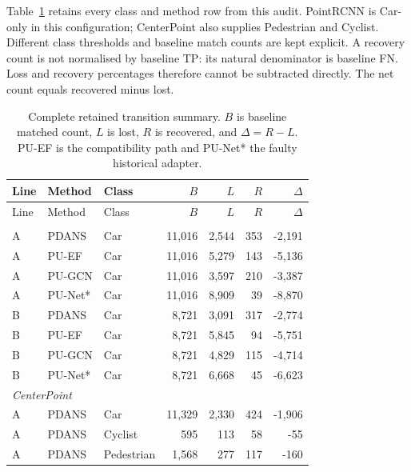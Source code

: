 
Table~\ref{tab:k-transition-all} retains every class and method row
from this audit. PointRCNN is Car-only in this configuration; CenterPoint
also supplies Pedestrian and Cyclist. Different class thresholds and
baseline match counts are kept explicit. A recovery count is not
normalised by baseline TP: its natural denominator is baseline FN.
Loss and recovery percentages therefore cannot be subtracted directly.
The net count equals recovered minus lost.

\begin{longtable}{lllrrrr}
\caption{Complete retained transition summary. $B$ is baseline matched
count, $L$ is lost, $R$ is recovered, and $\Delta=R-L$.
PU-EF is the compatibility path and PU-Net* the faulty historical adapter.}
\label{tab:k-transition-all}\\
\toprule Line & Method & Class & $B$ & $L$ & $R$ & $\Delta$\\\midrule\endfirsthead
\toprule Line & Method & Class & $B$ & $L$ & $R$ & $\Delta$\\\midrule\endhead
\bottomrule\endfoot
\multicolumn{7}{l}{\textit{PointRCNN}}\\
A & PDANS & Car & 11,016 & 2,544 & 353 & -2,191 \\
A & PU-EF & Car & 11,016 & 5,279 & 143 & -5,136 \\
A & PU-GCN & Car & 11,016 & 3,597 & 210 & -3,387 \\
A & PU-Net* & Car & 11,016 & 8,909 & 39 & -8,870 \\
B & PDANS & Car & 8,721 & 3,091 & 317 & -2,774 \\
B & PU-EF & Car & 8,721 & 5,845 & 94 & -5,751 \\
B & PU-GCN & Car & 8,721 & 4,829 & 115 & -4,714 \\
B & PU-Net* & Car & 8,721 & 6,668 & 45 & -6,623 \\
\multicolumn{7}{l}{\textit{CenterPoint}}\\
A & PDANS & Car & 11,329 & 2,330 & 424 & -1,906 \\
A & PDANS & Cyclist & 595 & 113 & 58 & -55 \\
A & PDANS & Pedestrian & 1,568 & 277 & 117 & -160 \\

\end{longtable}
